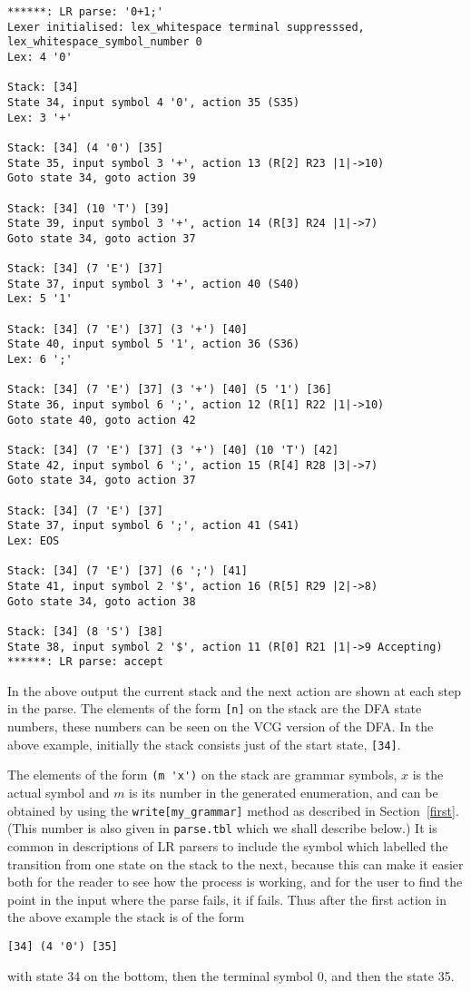 {\small
\begin{verbatim}
******: LR parse: '0+1;'
Lexer initialised: lex_whitespace terminal suppresssed, 
lex_whitespace_symbol_number 0
Lex: 4 '0'

Stack: [34] 
State 34, input symbol 4 '0', action 35 (S35)
Lex: 3 '+'

Stack: [34] (4 '0') [35] 
State 35, input symbol 3 '+', action 13 (R[2] R23 |1|->10)
Goto state 34, goto action 39

Stack: [34] (10 'T') [39] 
State 39, input symbol 3 '+', action 14 (R[3] R24 |1|->7)
Goto state 34, goto action 37

Stack: [34] (7 'E') [37] 
State 37, input symbol 3 '+', action 40 (S40)
Lex: 5 '1'

Stack: [34] (7 'E') [37] (3 '+') [40] 
State 40, input symbol 5 '1', action 36 (S36)
Lex: 6 ';'

Stack: [34] (7 'E') [37] (3 '+') [40] (5 '1') [36] 
State 36, input symbol 6 ';', action 12 (R[1] R22 |1|->10)
Goto state 40, goto action 42

Stack: [34] (7 'E') [37] (3 '+') [40] (10 'T') [42] 
State 42, input symbol 6 ';', action 15 (R[4] R28 |3|->7)
Goto state 34, goto action 37

Stack: [34] (7 'E') [37] 
State 37, input symbol 6 ';', action 41 (S41)
Lex: EOS

Stack: [34] (7 'E') [37] (6 ';') [41] 
State 41, input symbol 2 '$', action 16 (R[5] R29 |2|->8)
Goto state 34, goto action 38

Stack: [34] (8 'S') [38] 
State 38, input symbol 2 '$', action 11 (R[0] R21 |1|->9 Accepting)
******: LR parse: accept
\end{verbatim} 
} 

In the above output
the current stack and the next action are shown at
each step in the parse. The elements of the form \verb+[n]+
on the stack are the DFA state
numbers, these numbers can be seen on the VCG version of the DFA.
In the above example, initially the stack consists just of the start
state, \verb+[34]+.

The elements of the form \verb+(m 'x')+ on the stack
are grammar symbols, $x$ is the
actual symbol and $m$ is its number in the \gtb generated enumeration,
and can be obtained by using
the \verb+write[my_grammar]+ method as described in
Section~\ref{first}. (This number is also given in \verb+parse.tbl+
which we shall describe below.)
It is common in descriptions of LR parsers to include the symbol which
labelled the transition from one state on the stack to the next,
because this can make it easier both for the reader to see how the
process is working, and for the user to find the point in the input
where the parse fails, it if fails. Thus after the first action in the
above example the stack is of the form 
\begin{center}
\verb+[34] (4 '0') [35]+
\end{center}
with state 34 on the bottom, then the terminal symbol 0, and then the state 35.

